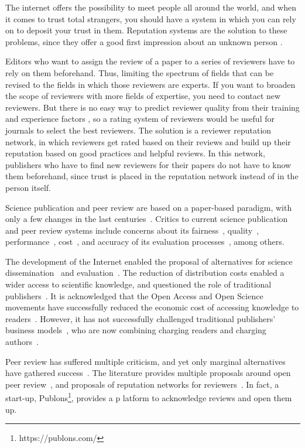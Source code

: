 The internet offers the possibility to meet people all around the world, and when
it comes to trust total strangers, you should have a system in which you can
rely on to deposit your trust in them. Reputation systems are the solution to these
problems, since they offer a good first impression about an unknown person
\cite{resnick2000reputation}.

Editors who want to assign the review of a paper to a series of reviewers have
to rely on them beforehand. Thus, limiting the spectrum of fields that can be
revised to the fields in which those reviewers are experts. If you want to
broaden the scope of reviewers with more fields of expertise, you need to
contact new reviewers. But there is no easy way to predict reviewer quality from
their training and experience factors
\cite{callaham_relationship_2007}, so a rating system of reviewers would be
useful for journals to select the best reviewers. The solution is a reviewer
reputation network, in which reviewers get rated based on their reviews and
build up their reputation based on good practices and helpful reviews. In this
network, publishers who have to find new reviewers for their papers do not have
to know them beforehand, since trust is placed in the reputation network instead
of in the person itself.

Science publication and peer review are based on a paper-based paradigm, with only a
few changes in the last centuries~\cite{spier2002history}. Critics to current
science publication and peer review systems include concerns about its
fairness~\cite{wenneras2001nepotism}, quality~\cite{goldbeck1999evidence},
performance~\cite{huisman2017duration}, cost~\cite{bergstrom2004costs}, and
accuracy of its evaluation processes~\cite{doi:10.1001/jama.295.1.90}, among
others.

The development of the Internet enabled the proposal of alternatives for science
dissemination~\cite{eysenbach2006citation} and
evaluation~\cite{walker_emerging_2015}. The reduction of distribution costs
enabled a wider access to scientific knowledge, and questioned the role of
traditional publishers~\cite{ReinventingRigor}. It is acknowledged that the Open
Access and Open Science movements have successfully reduced the economic cost of
accessing knowledge to readers~\cite{evans2009open}. However, it has not
successfully challenged traditional publishers' business
models~\cite{lariviere2015oligopoly}, who are now combining charging readers and
charging authors~\cite{van2013true}.

Peer review has suffered multiple criticism, and yet only marginal alternatives
have gathered success~\cite{ware2008peer}. The literature provides multiple
proposals around open peer review~\cite{ford2013defining}, and proposals of
reputation networks for reviewers~\cite{frishauf2009reputation}. In fact, a
start-up, Publons\footnote{https://publons.com/}, provides a p latform to
acknowledge reviews and open them up.

